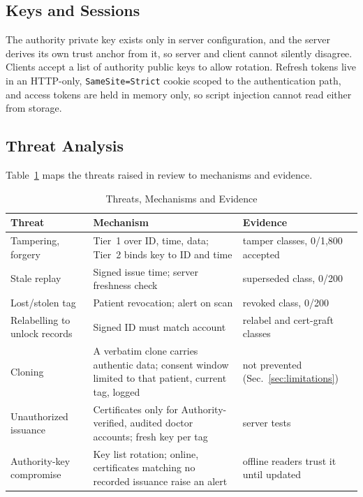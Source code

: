\documentclass[conference]{IEEEtran}
\begin{document}
\subsection{Keys and Sessions}
The authority private key exists only in server configuration, and the server derives its own trust anchor from it, so server and client cannot silently disagree. Clients accept a list of authority public keys to allow rotation. Refresh tokens live in an HTTP-only, \texttt{SameSite=Strict} cookie scoped to the authentication path, and access tokens are held in memory only, so script injection cannot read either from storage.

\subsection{Threat Analysis}
\label{sec:threats}
Table~\ref{tab:threats} maps the threats raised in review to mechanisms and evidence.

\begin{table}[htbp]
\caption{Threats, Mechanisms and Evidence}
\begin{center}
\footnotesize
\begin{tabular}{>{\raggedright\arraybackslash}p{1.65cm}>{\raggedright\arraybackslash}p{3.65cm}>{\raggedright\arraybackslash}p{1.7cm}}
\toprule
\textbf{Threat} & \textbf{Mechanism} & \textbf{Evidence} \\
\midrule
Tampering, forgery & Tier~1 over ID, time, data; Tier~2 binds key to ID and time & 9 tamper classes, 0/1{,}800 accepted \\
Stale replay & Signed issue time; server freshness check & superseded class, 0/200 \\
Lost/stolen tag & Patient revocation; alert on scan & revoked class, 0/200 \\
Relabelling to unlock records & Signed ID must match account & relabel and cert-graft classes \\
Cloning & A verbatim clone carries authentic data; consent window limited to that patient, current tag, logged & not prevented (Sec.~\ref{sec:limitations}) \\
Unauthorized issuance & Certificates only for Authority-verified, audited doctor accounts; fresh key per tag & server tests \\
Authority-key compromise & Key list rotation; online, certificates matching no recorded issuance raise an alert & offline readers trust it until updated \\
\bottomrule
\end{tabular}
\label{tab:threats}
\end{center}
\end{table}
\end{document}
